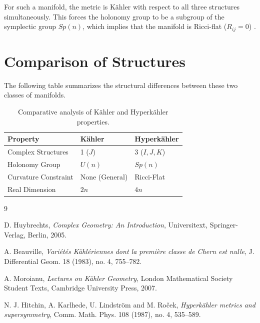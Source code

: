 \documentclass[11pt]{article}
\begin{document}
For such a manifold, the metric is Kähler with respect to all three structures simultaneously. This forces the holonomy group to be a subgroup of the symplectic group $Sp(n)$, which implies that the manifold is Ricci-flat ($R_{ij} = 0$) \cite{beauville}.

\section{Comparison of Structures}
The following table summarizes the structural differences between these two classes of manifolds.

\begin{table}[h]
\centering
\begin{tabular}{@{}lll@{}}
\toprule
\textbf{Property} & \textbf{Kähler} & \textbf{Hyperkähler} \\ \midrule
Complex Structures & 1 ($J$) & 3 ($I, J, K$) \\
Holonomy Group & $U(n)$ & $Sp(n)$ \\
Curvature Constraint & None (General) & Ricci-Flat \\
Real Dimension & $2n$ & $4n$ \\ \bottomrule
\end{tabular}
\caption{Comparative analysis of Kähler and Hyperkähler properties.}
\end{table}

\begin{thebibliography}{9}

D. Huybrechts, \textit{Complex Geometry: An Introduction}, Universitext, Springer-Verlag, Berlin, 2005.

A. Beauville, \textit{Variétés Kählériennes dont la première classe de Chern est nulle}, J. Differential Geom. 18 (1983), no. 4, 755--782.

A. Moroianu, \textit{Lectures on Kähler Geometry}, London Mathematical Society Student Texts, Cambridge University Press, 2007.

N. J. Hitchin, A. Karlhede, U. Lindström and M. Roček, \textit{Hyperkähler metrics and supersymmetry}, Comm. Math. Phys. 108 (1987), no. 4, 535--589.

\end{thebibliography}
\end{document}
